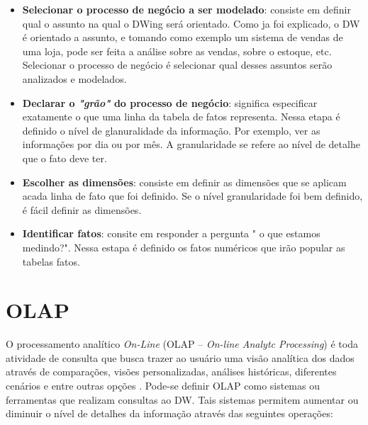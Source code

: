  \begin{itemize}
 \item \textbf{Selecionar o processo de negócio a ser modelado}: consiste em definir qual o assunto na qual o DWing será orientado. Como ja foi explicado, o DW é orientado a assunto, e tomando como exemplo um sistema de vendas de uma loja, pode ser feita a análise sobre as vendas, sobre o estoque, etc. Selecionar o processo de negócio é selecionar qual desses assuntos serão analizados e modelados.

 \item \textbf{Declarar o \emph{"grão"} do processo de negócio}: significa especificar exatamente o que uma linha da tabela de fatos representa. Nessa etapa é definido o nível de glanuralidade da informação. Por exemplo, ver as informações por dia ou por mês. A granularidade se refere ao nível de detalhe que o fato deve ter. 
 \item \textbf{Escolher as dimensões}: consiste em definir as dimensões que se aplicam acada linha de fato que foi definido. Se o nível granularidade foi bem definido, é fácil definir as dimensões. 
 \item \textbf{Identificar fatos}: consite em responder a pergunta "	o que estamos medindo?". Nessa estapa é definido os fatos numéricos que irão popular as tabelas fatos.	  
 \end{itemize}

\section{OLAP}

%

O processamento analítico \emph{On-Line} (OLAP – \emph{On-line Analytc Processing}) é toda atividade de consulta que busca trazer ao usuário uma visão analítica dos dados através de comparações, visões personalizadas, análises históricas, diferentes cenários e entre outras opções \cite{kimball2002}. Pode-se definir OLAP como sistemas ou ferramentas que realizam consultas ao DW. Tais sistemas permitem aumentar ou diminuir o nível de detalhes da informação através das seguintes operações:

%

